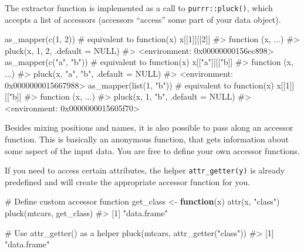 \documentclass[
]{krantz}
\makeatletter
\newenvironment{Shaded}{\begin{snugshade}}{\end{snugshade}}
\newcommand{\CommentTok}[1]{\textcolor[rgb]{0.56,0.35,0.01}{\textit{#1}}}
\newcommand{\ControlFlowTok}[1]{\textcolor[rgb]{0.13,0.29,0.53}{\textbf{#1}}}
\newcommand{\DecValTok}[1]{\textcolor[rgb]{0.00,0.00,0.81}{#1}}
\newcommand{\KeywordTok}[1]{\textcolor[rgb]{0.13,0.29,0.53}{\textbf{#1}}}
\newcommand{\NormalTok}[1]{#1}
\newcommand{\StringTok}[1]{\textcolor[rgb]{0.31,0.60,0.02}{#1}}
\newenvironment{kframe}{%
\medskip{}
\setlength{\fboxsep}{.8em}
 \def\at@end@of@kframe{}%
 \ifinner\ifhmode%
  \def\at@end@of@kframe{\end{minipage}}%
  \begin{minipage}{\columnwidth}%
 \fi\fi%
 \def\FrameCommand##1{\hskip\@totalleftmargin \hskip-\fboxsep
 \colorbox{shadecolor}{##1}\hskip-\fboxsep
     \hskip-\linewidth \hskip-\@totalleftmargin \hskip\columnwidth}%
 \MakeFramed {\advance\hsize-\width
   \@totalleftmargin\z@ \linewidth\hsize
   \@setminipage}}%
 {\par\unskip\endMakeFramed%
 \at@end@of@kframe}
\renewenvironment{Shaded}{\begin{kframe}}{\end{kframe}}
\renewcommand{\KeywordTok} [1]{\textcolor[rgb]{0.00,0.44,0.13}{{#1}}}
\renewcommand{\DecValTok}  [1]{\textcolor[rgb]{0.25,0.63,0.44}{{#1}}}
\renewcommand{\StringTok}  [1]{\textcolor[rgb]{0.25,0.44,0.63}{{#1}}}
\renewcommand{\CommentTok} [1]{\textcolor[rgb]{0.38,0.63,0.69}{{#1}}}
\renewcommand{\NormalTok}  [1]{{#1}}
\makeatother
\begin{document}
The extractor function is implemented as a call to \texttt{purrr::pluck()}, which accepts a list of accessors (accessors ``access'' some part of your data object).

\begin{Shaded}
\begin{Highlighting}[]
\KeywordTok{as_mapper}\NormalTok{(}\KeywordTok{c}\NormalTok{(}\DecValTok{1}\NormalTok{, }\DecValTok{2}\NormalTok{))  }\CommentTok{# equivalent to function(x) x[[1]][[2]]}
\CommentTok{#> function (x, ...) }
\CommentTok{#> pluck(x, 1, 2, .default = NULL)}
\CommentTok{#> <environment: 0x00000000156ec898>}
\KeywordTok{as_mapper}\NormalTok{(}\KeywordTok{c}\NormalTok{(}\StringTok{"a"}\NormalTok{, }\StringTok{"b"}\NormalTok{))  }\CommentTok{# equivalent to function(x) x[["a"]][["b]]}
\CommentTok{#> function (x, ...) }
\CommentTok{#> pluck(x, "a", "b", .default = NULL)}
\CommentTok{#> <environment: 0x0000000015667988>}
\KeywordTok{as_mapper}\NormalTok{(}\KeywordTok{list}\NormalTok{(}\DecValTok{1}\NormalTok{, }\StringTok{"b"}\NormalTok{))  }\CommentTok{# equivalent to function(x) x[[1]][["b]]}
\CommentTok{#> function (x, ...) }
\CommentTok{#> pluck(x, 1, "b", .default = NULL)}
\CommentTok{#> <environment: 0x0000000015605f70>}
\end{Highlighting}
\end{Shaded}

Besides mixing positions and names, it is also possible to pass along an accessor function. This is basically an anonymous function, that gets information about some aspect of the input data. You are free to define your own accessor functions.

If you need to access certain attributes, the helper \texttt{attr\_getter(y)} is already predefined and will create the appropriate accessor function for you.

\begin{Shaded}
\begin{Highlighting}[]
\CommentTok{# Define custom accessor function}
\NormalTok{get_class <-}\StringTok{ }\ControlFlowTok{function}\NormalTok{(x) }\KeywordTok{attr}\NormalTok{(x, }\StringTok{"class"}\NormalTok{)}
\KeywordTok{pluck}\NormalTok{(mtcars, get_class)}
\CommentTok{#> [1] "data.frame"}

\CommentTok{# Use attr_getter() as a helper}
\KeywordTok{pluck}\NormalTok{(mtcars, }\KeywordTok{attr_getter}\NormalTok{(}\StringTok{"class"}\NormalTok{))}
\CommentTok{#> [1] "data.frame"}
\end{Highlighting}
\end{Shaded}
\end{document}
